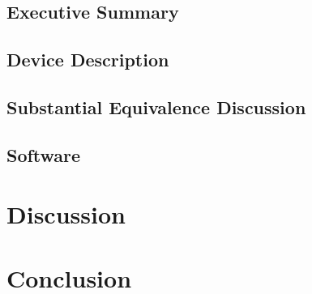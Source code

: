 \documentclass{article}
\begin{document}
\setcounter{subsection}{0}
\subsection{Executive Summary}
\subsection{Device Description}
\subsection{Substantial Equivalence Discussion}





\subsection{Software}




\section{Discussion}
\label{sec:discussion}

\section{Conclusion}
\label{sec:conclusion}


\newpage
{}


\end{document}
